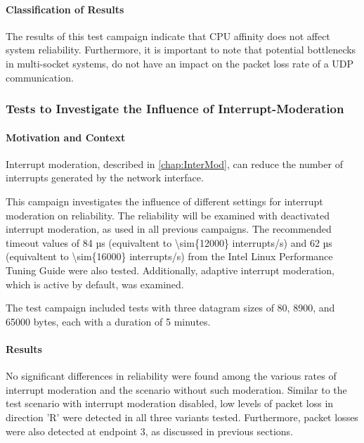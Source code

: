 \paragraph{Classification of Results}
The results of this test campaign indicate that CPU affinity does not affect system reliability. Furthermore, it is important to note that potential bottlenecks in multi-socket systems, do not have an impact on the packet loss rate of a UDP communication.


\subsubsection{Tests to Investigate the Influence of Interrupt-Moderation}
\paragraph{Motivation and Context}

Interrupt moderation, described in \ref{chap:InterMod}, can reduce the number of interrupts generated by the network interface.

This campaign investigates the influence of different settings for interrupt moderation on reliability. The reliability will be examined with deactivated interrupt moderation, as used in all previous campaigns. The recommended timeout values of 84 µs (equivaltent to \num{\sim{12000}} interrupts/s) and 62 µs (equivaltent to \num{\sim{16000}} interrupts/s) from the Intel Linux Performance Tuning Guide \cite{intermod03} were also tested. Additionally, adaptive interrupt moderation, which is active by default, was examined.  

The test campaign included tests with three datagram sizes of 80, 8900, and 65000 bytes, each with a duration of 5 minutes.

\paragraph{Results}
No significant differences in reliability were found among the various rates of interrupt moderation and the scenario without such moderation. Similar to the test scenario with interrupt moderation disabled, low levels of packet loss in direction 'R' were detected in all three variants tested. Furthermore, packet losses were also detected at endpoint 3, as discussed in previous sections.

